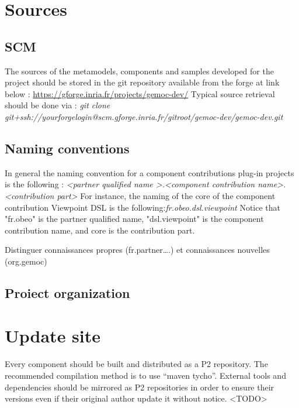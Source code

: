 \documentclass{gemoc} %
\begin{document}
\section{Sources}
\subsection{SCM}
The sources of the metamodels, components and samples developed for the project should be stored in the git repository available from the forge at link below :\newline
\url{https://gforge.inria.fr/projects/gemoc-dev/}
\newline\newline
Typical source retrieval should be done via :\newline
\textit{git clone git+ssh://yourforgelogin@scm.gforge.inria.fr/gitroot/gemoc-dev/gemoc-dev.git}
\subsection{Naming conventions}
In general the naming convention for a component contributions plug-in projects is the following :
\newline
\textit{\textless partner qualified name \textgreater.\textless component contribution name\textgreater .\textless contribution part\textgreater }
\newline\newline
For instance, the naming of the core of the component contribution Viewpoint DSL is the following:\textit{fr.obeo.dsl.viewpoint}
\newline
Notice that "fr.obeo" is the partner qualified name, "dsl.viewpoint" is the component contribution name, and core is the contribution part.
\newline

Distinguer connaissances propres (fr.partner….) et connaissances nouvelles (org.gemoc)
\subsection{Proiect organization}
\section{Update site}
Every component should be built and distributed as a P2 repository. The recommended compilation method is to use “maven tycho”.
\newline
External tools and dependencies should be mirrored as P2 repositories in order to ensure their versions even if their original author update it without notice.
\newline
\textless TODO\textgreater
\end{document}
